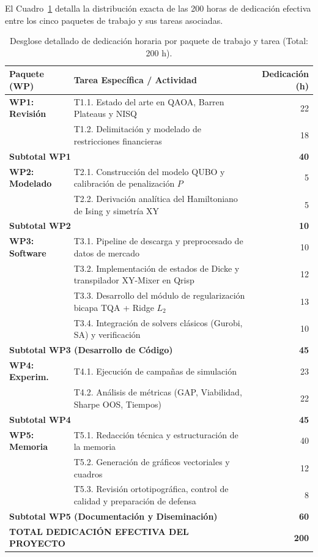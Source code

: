 El Cuadro~\ref{tab:desglose_horas_tareas} detalla la distribución exacta de las 200 horas de dedicación efectiva entre los cinco paquetes de trabajo y sus tareas asociadas.

\begin{table}[htbp]
    \centering
    \small
    \caption{Desglose detallado de dedicación horaria por paquete de trabajo y tarea (Total: 200 h).}
    \label{tab:desglose_horas_tareas}
    \renewcommand{\arraystretch}{1.2}
    \begin{tabular}{p{2.2cm}p{7.8cm}r}
        \toprule
        \textbf{Paquete (WP)} & \textbf{Tarea Específica / Actividad} & \textbf{Dedicación (h)} \\
        \midrule
        \textbf{WP1: Revisión} & T1.1. Estado del arte en QAOA, Barren Plateaus y NISQ & 22 \\
        & T1.2. Delimitación y modelado de restricciones financieras & 18 \\
        \multicolumn{2}{l}{\textbf{Subtotal WP1}} & \textbf{40} \\
        \midrule
        \textbf{WP2: Modelado} & T2.1. Construcción del modelo QUBO y calibración de penalización $P$ & 5 \\
        & T2.2. Derivación analítica del Hamiltoniano de Ising y simetría XY & 5 \\
        \multicolumn{2}{l}{\textbf{Subtotal WP2}} & \textbf{10} \\
        \midrule
        \textbf{WP3: Software} & T3.1. Pipeline de descarga y preprocesado de datos de mercado & 10 \\
        & T3.2. Implementación de estados de Dicke y transpilador XY-Mixer en Qrisp & 12 \\
        & T3.3. Desarrollo del módulo de regularización bicapa TQA + Ridge $L_2$ & 13 \\
        & T3.4. Integración de solvers clásicos (Gurobi, SA) y verificación & 10 \\
        \multicolumn{2}{l}{\textbf{Subtotal WP3 (Desarrollo de Código)}} & \textbf{45} \\
        \midrule
        \textbf{WP4: Experim.} & T4.1. Ejecución de campañas de simulación & 23 \\
        & T4.2. Análisis de métricas (GAP, Viabilidad, Sharpe OOS, Tiempos) & 22 \\
        \multicolumn{2}{l}{\textbf{Subtotal WP4}} & \textbf{45} \\
        \midrule
        \textbf{WP5: Memoria} & T5.1. Redacción técnica y estructuración de la memoria & 40 \\
        & T5.2. Generación de gráficos vectoriales y cuadros & 12 \\
        & T5.3. Revisión ortotipográfica, control de calidad y preparación de defensa & 8 \\
        \multicolumn{2}{l}{\textbf{Subtotal WP5 (Documentación y Diseminación)}} & \textbf{60} \\
        \midrule
        \multicolumn{2}{l}{\textbf{TOTAL DEDICACIÓN EFECTIVA DEL PROYECTO}} & \textbf{200} \\
        \bottomrule
    \end{tabular}
\end{table}

